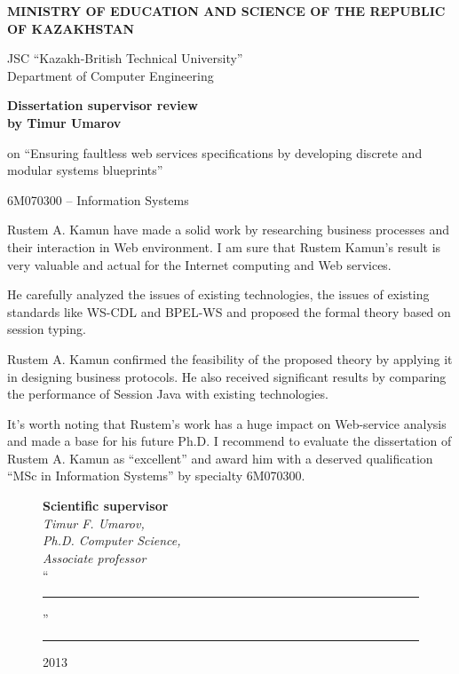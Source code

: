 \pagebreak
\thispagestyle{empty}

\begin{centering}
{\bf{\MakeUppercase{Ministry of education and science of the republic of Kazakhstan}}

\vspace{14pt}

JSC ``Kazakh-British Technical University''\\
Department of Computer Engineering}
\vspace{14pt}

{\bf
Dissertation supervisor review\\
by Timur Umarov
}

on ``Ensuring faultless web services specifications by developing discrete and modular systems blueprints''

\vspace{14pt}
\small 6M070300 -- Information Systems

\end{centering}



Rustem A. Kamun have made a solid work by researching business processes and their interaction in Web environment. I am sure that Rustem Kamun’s result is very valuable and actual for the Internet computing and Web services.

He carefully analyzed the issues of existing technologies, the issues of existing standards like WS-CDL and BPEL-WS and proposed the formal theory based on session typing.

Rustem A. Kamun confirmed the feasibility of the proposed theory by applying it in designing business protocols. He also received significant results by comparing the performance of Session Java with existing technologies.

It’s worth noting that Rustem's work has a huge impact on Web-service analysis and made a base for his future Ph.D.
I recommend to evaluate the dissertation of Rustem A. Kamun as ``excellent'' and award him with a deserved qualification ``MSc in Information Systems'' by specialty 6M070300.


\begin{figure}[ht]
\begin{minipage}[t]{0.6\linewidth}
{\bf Scientific supervisor}\\

{\em Timur F. Umarov,\\
Ph.D. Computer Science,\\
Associate professor}\\

``\rule{2em}{0.4pt}'' \rule{8em}{0.4pt} 2013\\
\end{minipage}
\end{figure}

